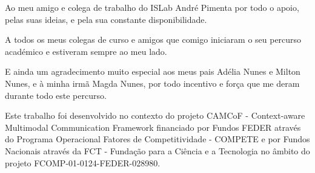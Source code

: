 \documentclass[a4paper, 12pt, oneside]{Thesis}  %
\begin{document}
Ao meu amigo e colega de trabalho do ISLab André Pimenta por todo o apoio, pelas suas ideias, e pela sua constante disponibilidade.

A todos os meus colegas de curso e amigos que comigo iniciaram o seu percurso académico e estiveram sempre ao meu lado.

E ainda um agradecimento muito especial aos meus pais Adélia Nunes e Milton Nunes, e à minha irmã Magda Nunes, por todo incentivo e força que me deram durante todo este percurso.

\newpage
\thispagestyle{empty}
\vspace*{\fill}

Este trabalho foi desenvolvido no contexto do projeto CAMCoF - Context-aware Multimodal Communication Framework financiado por Fundos FEDER através do Programa Operacional Fatores de Competitividade - COMPETE e por Fundos Nacionais através da FCT - Fundação para a Ciência e a Tecnologia no âmbito do projeto FCOMP-01-0124-FEDER-028980.\\
\end{document}
